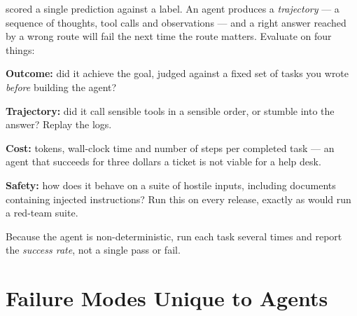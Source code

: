 \begin{conceptbox}
 scored a single prediction against a label. An agent produces a
\emph{trajectory} --- a sequence of thoughts, tool calls and observations --- and a
right answer reached by a wrong route will fail the next time the route matters.
Evaluate on four things:

\begin{tight}
  \item \textbf{Outcome:} did it achieve the goal, judged against a fixed set of
        tasks you wrote \emph{before} building the agent?
  \item \textbf{Trajectory:} did it call sensible tools in a sensible order, or
        stumble into the answer? Replay the logs.
  \item \textbf{Cost:} tokens, wall-clock time and number of steps per completed
        task --- an agent that succeeds for three dollars a ticket is not viable
        for a help desk.
  \item \textbf{Safety:} how does it behave on a suite of hostile inputs,
        including documents containing injected instructions? Run this on every
        release, exactly as  would run a red-team suite.
\end{tight}
Because the agent is non-deterministic, run each task several times and report the
\emph{success rate}, not a single pass or fail.
\end{conceptbox}

\section{Failure Modes Unique to Agents}

